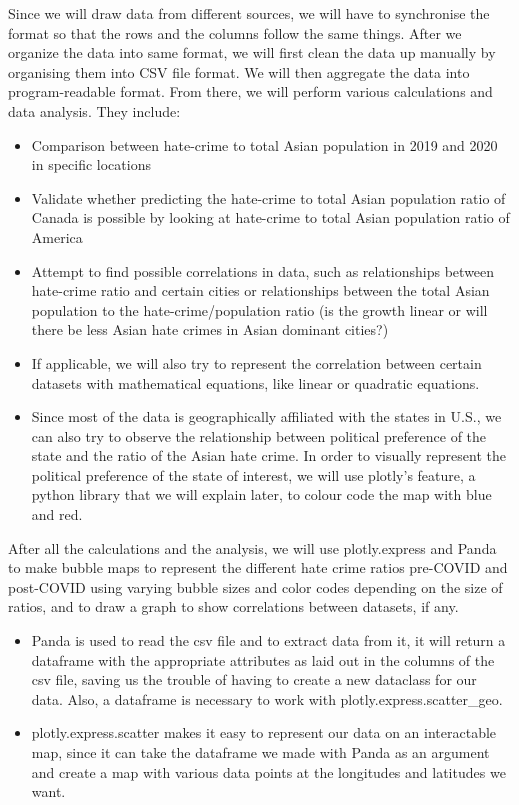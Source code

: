 \documentclass[fontsize=11pt]{article}
\begin{document}
    Since we will draw data from different sources, we will have to synchronise the format so that the rows and the columns follow the same things. After we organize the data into same format, we will first clean the data up manually by organising them into CSV file format. We will then aggregate the data into program-readable format. From there, we will perform various calculations and data analysis. They include:
    \begin{itemize}
        \item  Comparison between hate-crime to total Asian population in 2019 and 2020 in specific locations
        \item Validate whether predicting the hate-crime to total Asian population ratio of Canada is possible by looking at hate-crime to total Asian population ratio of America
        \item     Attempt to find possible correlations in data, such as relationships between hate-crime ratio and certain cities or relationships between the total Asian population to the hate-crime/population ratio (is the growth linear or will there be less Asian hate crimes in Asian dominant cities?)
        \item     If applicable, we will also try to represent the correlation between certain datasets with mathematical equations, like linear or quadratic equations.
        \item     Since most of the data is geographically affiliated with the states in U.S., we can also try to observe the relationship between political preference of the state and the ratio of the Asian hate crime. In order to visually represent the political preference of the state of interest, we will use plotly’s feature, a python library that we will explain later, to colour code the map with blue and red.
    \end{itemize}
    After all the calculations and the analysis, we will use plotly.express and Panda to make bubble maps to represent the different hate crime ratios pre-COVID and post-COVID using varying bubble sizes and color codes depending on the size of ratios, and to draw a graph to show correlations between datasets, if any.
    \begin{itemize}
        \item     Panda is used to read the csv file and to extract data from it, it will return a dataframe with the appropriate attributes as laid out in the columns of the csv file, saving us the trouble of having to create a new dataclass for our data. Also, a dataframe is necessary to work with plotly.express.scatter\_geo.
        \item     plotly.express.scatter makes it easy to represent our data on an interactable map, since it can take the dataframe we made with Panda as an argument and create a map with various data points at the longitudes and latitudes we want.
    \end{itemize}
\end{document}

